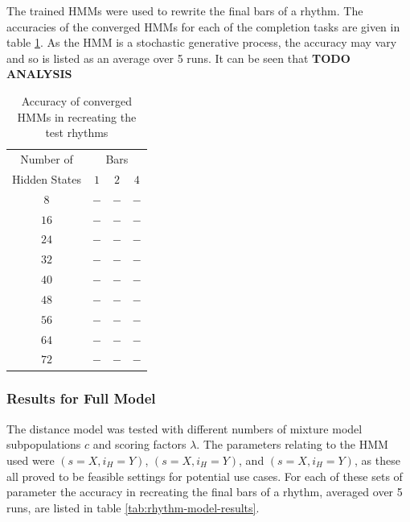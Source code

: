 \documentclass[ author={Stephen Livermore-Tozer},
				supervisor={Dr. Peter Flach},
				degree={MEng},
				title={Algorithmic Co-composition Using Machine Learning},
				subtitle={},
				type={research},
				year={2016} ]{dissertation}
\begin{document}
	The trained HMMs were used to rewrite the final bars of a rhythm. The accuracies of the converged HMMs for each of the completion tasks are given in table \ref{tab:hmm-results}. As the HMM is a stochastic generative process, the accuracy may vary and so is listed as an average over 5 runs. It can be seen that \textbf{TODO ANALYSIS}
	
	\begin{table}[h]
		\begin{center}
			\begin{tabular}{cccc}
				\toprule
				Number of& \multicolumn{3}{c}{Bars}\\
				\cline{2-4}
				Hidden States& $1$ & $2$ & $4$\\
				\hline
				$8$ & $-$ & $-$ & $-$\\
				$16$ & $-$ & $-$ & $-$\\
				$24$ & $-$ & $-$ & $-$\\
				$32$ & $-$ & $-$ & $-$\\
				$40$ & $-$ & $-$ & $-$\\
				$48$ & $-$ & $-$ & $-$\\
				$56$ & $-$ & $-$ & $-$\\
				$64$ & $-$ & $-$ & $-$\\
				$72$ & $-$ & $-$ & $-$\\
				\bottomrule
			\end{tabular}
		\end{center}
		\caption{Accuracy of converged HMMs in recreating the test rhythms}
		\label{tab:hmm-results}
	\end{table}
	
	\subsubsection{Results for Full Model}
	
	The distance model was tested with different numbers of mixture model subpopulations $c$ and scoring factors $\lambda$. The parameters relating to the HMM used were $(s = X, i_H = Y)$, $(s = X, i_H = Y)$, and $(s = X, i_H = Y)$, as these all proved to be feasible settings for potential use cases. For each of these sets of parameter the accuracy in recreating the final bars of a rhythm, averaged over 5 runs, are listed in table \ref{tab:rhythm-model-results}.
	
\end{document}
